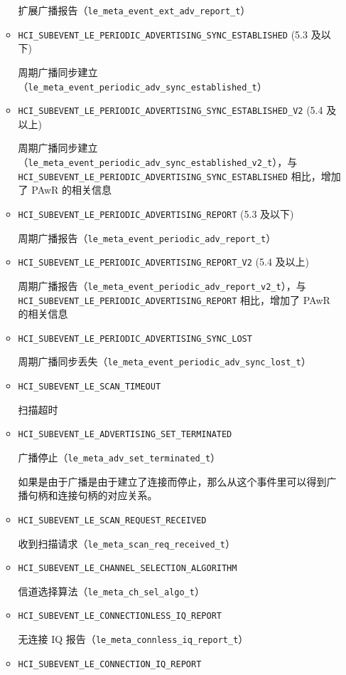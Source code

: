 \documentclass[
  12pt,
]{book}
\begin{document}
\begin{enumerate}
\begin{itemize}
    扩展广播报告（\texttt{le\_meta\_event\_ext\_adv\_report\_t}）
  \item
    \texttt{HCI\_SUBEVENT\_LE\_PERIODIC\_ADVERTISING\_SYNC\_ESTABLISHED} (5.3 及以下)

    周期广播同步建立（\texttt{le\_meta\_event\_periodic\_adv\_sync\_established\_t}）
  \item
    \texttt{HCI\_SUBEVENT\_LE\_PERIODIC\_ADVERTISING\_SYNC\_ESTABLISHED\_V2} (5.4 及以上)

    周期广播同步建立（\texttt{le\_meta\_event\_periodic\_adv\_sync\_established\_v2\_t}），与
    \texttt{HCI\_SUBEVENT\_LE\_PERIODIC\_ADVERTISING\_SYNC\_ESTABLISHED} 相比，增加了 PAwR 的相关信息
  \item
    \texttt{HCI\_SUBEVENT\_LE\_PERIODIC\_ADVERTISING\_REPORT} (5.3 及以下)

    周期广播报告（\texttt{le\_meta\_event\_periodic\_adv\_report\_t}）
  \item
    \texttt{HCI\_SUBEVENT\_LE\_PERIODIC\_ADVERTISING\_REPORT\_V2} (5.4 及以上)

    周期广播报告（\texttt{le\_meta\_event\_periodic\_adv\_report\_v2\_t}），与
    \texttt{HCI\_SUBEVENT\_LE\_PERIODIC\_ADVERTISING\_REPORT} 相比，增加了 PAwR 的相关信息
  \item
    \texttt{HCI\_SUBEVENT\_LE\_PERIODIC\_ADVERTISING\_SYNC\_LOST}

    周期广播同步丢失（\texttt{le\_meta\_event\_periodic\_adv\_sync\_lost\_t}）
  \item
    \texttt{HCI\_SUBEVENT\_LE\_SCAN\_TIMEOUT}

    扫描超时
  \item
    \texttt{HCI\_SUBEVENT\_LE\_ADVERTISING\_SET\_TERMINATED}

    广播停止（\texttt{le\_meta\_adv\_set\_terminated\_t}）

    如果是由于广播是由于建立了连接而停止，那么从这个事件里可以得到广播句柄和连接句柄的对应关系。
  \item
    \texttt{HCI\_SUBEVENT\_LE\_SCAN\_REQUEST\_RECEIVED}

    收到扫描请求（\texttt{le\_meta\_scan\_req\_received\_t}）
  \item
    \texttt{HCI\_SUBEVENT\_LE\_CHANNEL\_SELECTION\_ALGORITHM}

    信道选择算法（\texttt{le\_meta\_ch\_sel\_algo\_t}）
  \item
    \texttt{HCI\_SUBEVENT\_LE\_CONNECTIONLESS\_IQ\_REPORT}

    无连接 IQ 报告（\texttt{le\_meta\_connless\_iq\_report\_t}）
  \item
    \texttt{HCI\_SUBEVENT\_LE\_CONNECTION\_IQ\_REPORT}


\end{itemize}
\end{enumerate}
\end{document}
